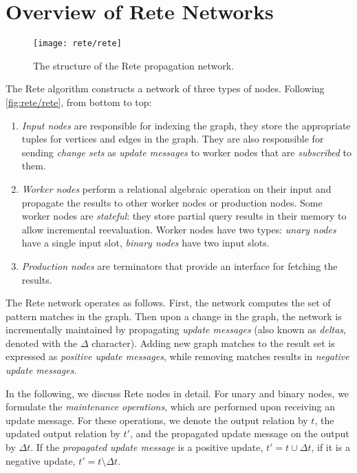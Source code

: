 \section{Overview of Rete Networks}
\label{sec:rete}

\begin{figure}
	\centering
	\texttt{[image: rete/rete]}
	\caption{The structure of the Rete propagation network.}
	\label{fig:rete/rete}
\end{figure}


The Rete algorithm constructs a network of three types of nodes. Following \autoref{fig:rete/rete}, from bottom to top:

\begin{enumerate}
	\item \emph{Input nodes} are responsible for indexing the graph, \ie they store the appropriate tuples for vertices and edges in the graph. They are also responsible for sending \emph{change sets} as \emph{update messages} to worker nodes that are \emph{subscribed} to them.
	\item \emph{Worker nodes} perform a relational algebraic operation on their input and propagate the results to other worker nodes or production nodes. Some worker nodes are \emph{stateful}: they store partial query results in their memory to allow incremental reevaluation.
	Worker nodes have two types: \emph{unary nodes} have a single input slot, \emph{binary nodes} have two input slots.
	\item \emph{Production nodes} are terminators that provide an interface for fetching the results.
\end{enumerate}

The Rete network operates as follows. First, the network computes the set of pattern matches in the graph. Then upon a change in the graph, the network is incrementally maintained by propagating \emph{update messages} (also known as \emph{deltas}, denoted with the $\Delta$ character). Adding new graph matches to the result set is expressed as \emph{positive update messages}, while removing matches results in \emph{negative update messages}.


In the following, we discuss Rete nodes in detail. For unary and binary nodes, we formulate the \emph{maintenance operations}, which are performed upon receiving an update message. For these operations, we denote the output relation by $t$, the updated output relation by $t'$, and the propagated update message on the output by $\Delta t$. If the \emph{propagated update message} is a positive update, $t' = t \cup \Delta t$, if it is a negative update, $t' = t \setminus \Delta t$.

